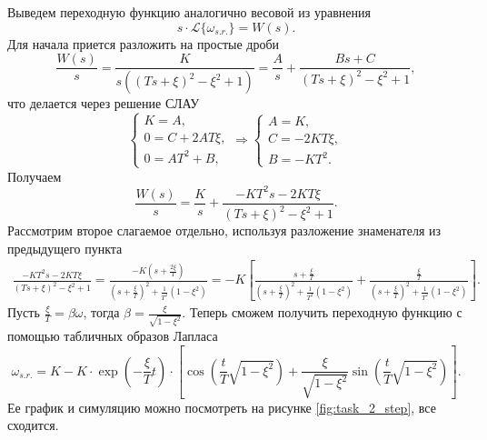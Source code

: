 Выведем переходную функцию аналогично весовой из уравнения
\begin{equation*}
    s\cdot\mathcal L\{\omega_{s.r.}\}=W(s).
\end{equation*}
Для начала приется разложить на простые дроби
\begin{equation*}
    \frac{W(s)}{s}=\frac{K}{s((Ts+\xi)^2-\xi^2+1)}=\frac{A}{s}+\frac{Bs+C}{(Ts+\xi)^2-\xi^2+1},
\end{equation*}
что делается через решение СЛАУ
\begin{equation*}
    \begin{cases}
        K=A,\\
        0=C+2AT\xi,\\
        0=AT^2+B,
    \end{cases}\Rightarrow
    \begin{cases}
        A=K,\\
        C=-2KT\xi,\\
        B=-KT^2.
    \end{cases}
\end{equation*}
Получаем
\begin{equation*}
    \frac{W(s)}{s}=\frac{K}{s}+\frac{-KT^2s-2KT\xi}{(Ts+\xi)^2-\xi^2+1}.
\end{equation*}
Рассмотрим второе слагаемое отдельно, используя разложение знаменателя из
предыдущего пункта
\begin{multline*}
    \frac{-KT^2s-2KT\xi}{(Ts+\xi)^2-\xi^2+1}
    =\frac{-K(s+\frac{2\xi}{T})}{\left(s+\frac{\xi}{T}\right)^2+\frac{1}{T^2}(1-\xi^2)}
    =-K\left[
        \frac{s+\frac{\xi}{T}}{\left(s+\frac{\xi}{T}\right)^2+\frac{1}{T^2}(1-\xi^2)}
        +\frac{\frac{\xi}{T}}{\left(s+\frac{\xi}{T}\right)^2+\frac{1}{T^2}(1-\xi^2)}
    \right].
\end{multline*}
Пусть $\frac{\xi}{T}=\beta\omega$, тогда $\beta=\frac{\xi}{\sqrt{1-\xi^2}}$. Теперь сможем
получить переходную функцию с помощью табличных образов Лапласа
\begin{equation*}
    \omega_{s.r.}=K-K\cdot\exp{\left(-\frac{\xi}{T}t\right)}\cdot\left[\cos\left(\frac{t}{T}\sqrt{1-\xi^2}\right)+\frac{\xi}{\sqrt{1-\xi^2}}\sin\left(\frac{t}{T}\sqrt{1-\xi^2}\right)\right].
\end{equation*}
Ее график и симуляцию можно посмотреть на рисунке \ref{fig:task_2_step}, все сходится.


